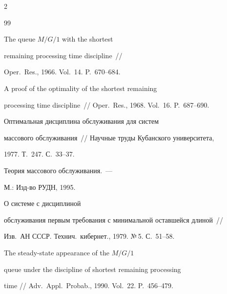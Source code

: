 \begin{multicols}{2}
{{\begin{thebibliography}{99}




The queue $M/G/1$ with the shortest


remaining processing time discipline~//


Oper.\ Res., 1966. Vol.~14. P.~670--684.









A proof of the optimality of the shortest remaining


processing time discipline~// Oper.\ Res., 1968. Vol.~16. P.~687--690.









Оптимальная дисциплина обслуживания для систем


массового обслуживания~// Научные труды Кубанского университета,


1977. Т.~247. С.~33--37.









Теория массового обслуживания.~---


М.: Изд-во РУДН, 1995.









О системе с дисциплиной


обслуживания первым требования с минимальной оставшейся длиной~//


Изв.\ АН СССР. Технич.\ кибернет., 1979. №\,5. С.~51--58.







 The steady-state appearance of the $M/G/1$


queue under the discipline of shortest remaining processing


time // Adv.\ Appl.\ Probab., 1990. Vol.~22. P.~456--479.






\end{thebibliography}}}
\end{multicols}
